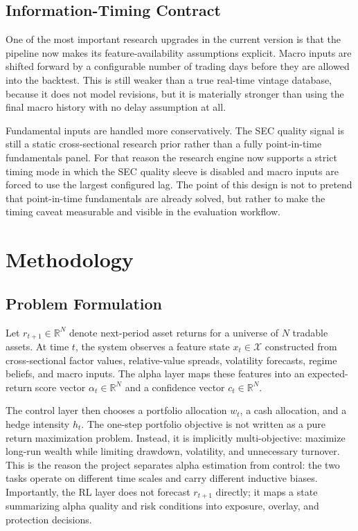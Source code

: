 \documentclass[10pt,twocolumn]{article}
\begin{document}
\subsection{Information-Timing Contract}

One of the most important research upgrades in the current version is that the
pipeline now makes its feature-availability assumptions explicit. Macro inputs
are shifted forward by a configurable number of trading days before they are
allowed into the backtest. This is still weaker than a true real-time vintage
database, because it does not model revisions, but it is materially stronger
than using the final macro history with no delay assumption at all.

Fundamental inputs are handled more conservatively. The SEC quality signal is
still a static cross-sectional research prior rather than a fully point-in-time
fundamentals panel. For that reason the research engine now supports a strict
timing mode in which the SEC quality sleeve is disabled and macro inputs are
forced to use the largest configured lag. The point of this design is not to
pretend that point-in-time fundamentals are already solved, but rather to make
the timing caveat measurable and visible in the evaluation workflow.

\section{Methodology}

\subsection{Problem Formulation}

Let $r_{t+1} \in \mathbb{R}^N$ denote next-period asset returns for a universe of
$N$ tradable assets. At time $t$, the system observes a feature state
$x_t \in \mathcal{X}$ constructed from cross-sectional factor values,
relative-value spreads, volatility forecasts, regime beliefs, and macro inputs.
The alpha layer maps these features into an expected-return score vector
$\alpha_t \in \mathbb{R}^N$ and a confidence vector $c_t \in \mathbb{R}^N$.

The control layer then chooses a portfolio allocation $w_t$, a cash allocation,
and a hedge intensity $h_t$. The one-step portfolio objective is not written as
a pure return maximization problem. Instead, it is implicitly multi-objective:
maximize long-run wealth while limiting drawdown, volatility, and unnecessary
turnover. This is the reason the project separates alpha estimation from control:
the two tasks operate on different time scales and carry different inductive
biases.
Importantly, the RL layer does not forecast $r_{t+1}$ directly; it maps a state
summarizing alpha quality and risk conditions into exposure, overlay, and
protection decisions.
\end{document}
